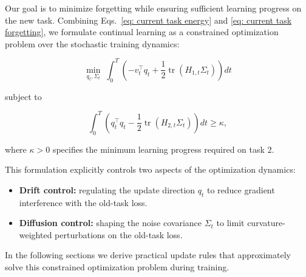 \documentclass{article}
\begin{document}

Our goal is to minimize forgetting while ensuring sufficient learning progress on the new task. 
Combining Eqs.~\eqref{eq: current task energy} and 
\eqref{eq: current task forgetting}, we formulate continual learning as a constrained optimization problem over the stochastic training dynamics:

\begin{equation}
\min_{q_t,\Sigma_t}
\;
\int_0^T
\left(
-
v_t^\top q_t
+
\frac12
\operatorname{tr}(H_{1,t}\Sigma_t)
\right)dt
\end{equation}

subject to

\begin{equation}
\int_0^T
\left(
q_t^\top q_t
-
\frac12
\operatorname{tr}(H_{2,t}\Sigma_t)
\right)dt
\ge \kappa ,
\end{equation}

where $\kappa>0$ specifies the minimum learning progress required on task $2$.

This formulation explicitly controls two aspects of the optimization dynamics:

\begin{itemize}
\item \textbf{Drift control:} regulating the update direction $q_t$ to reduce gradient interference with the old-task loss.
\item \textbf{Diffusion control:} shaping the noise covariance $\Sigma_t$ to limit curvature-weighted perturbations on the old-task loss.
\end{itemize}

In the following sections we derive practical update rules that approximately solve this constrained optimization problem during training.
\end{document}
